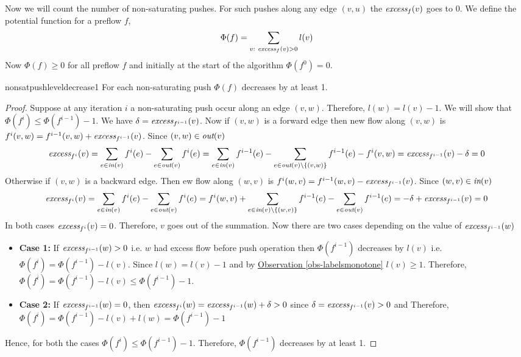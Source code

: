 Now we will count the number of non-saturating pushes. For such pushes along any edge $(v,u)$ the $\emph{excess}_f(v)$ goes to $0$. We define the potential function for a preflow $f$, $$\Phi(f)=\sum_{v:\emph{ excess}_f(v)>0}l(v)$$Now $\Phi(f)\geq 0$ for all preflow $f$ and initially at the start of the algorithm $\Phi(f^0)=0$.

\begin{lemma}{}{nonsatpushleveldecrease1}
	For each non-saturating push  $\Phi(f)$ decreases by at least 1.
\end{lemma}
\begin{proof}
	Suppose 	at any iteration $i$  a non-saturating push occur along an edge $(v,w)$. Therefore, $l(w)=l(v)-1$. We will show that $\Phi(f^i)\leq \Phi(f^{i-1})-1$.		We have $\delta=\emph{excess}_{f^{i-1}}(v)$. Now if $(v,w)$ is a forward edge then new flow along $(v,w)$ is $f^i(v,w)=f^{i-1}(v,w)+\emph{excess}_{f^{i-1}}(v)$. Since $(v,w)\in \emph{out}(v)$
	$$\emph{excess}_{f^i}(v)=\sum_{e\in \emph{in}(v)}f^i(e)-\sum_{e\in \emph{out}(v)}f^i(e)=          \sum_{e\in \emph{in}(v)}f^{i-1}(e)-\sum_{e\in \emph{out}(v)\setminus\{(v,w)\}}f^{i-1}(e)-f^i(v,w)  =   \emph{excess}_{f^{i-1}}(v)-\delta=0$$ Otherwise if $(v,w)$ is a backward edge. Then  ew flow along $(w,v)$ is  $f^i(w,v)=f^{i-1}(w,v)-\emph{excess}_{f^{i-1}}(v)$. Since $(w,v)\in \emph{in}(v)$ $$\emph{excess}_{f^i}(v)=\sum_{e\in \emph{in}(v)}f^i(e)-\sum_{e\in \emph{out}(v)}f^i(e)=    f^{i}(w,v) +     \sum_{e\in \emph{in}(v)\setminus\{(w,v)\}}f^{i-1}(e)-\sum_{e\in \emph{out}(v)}f^{i-1}(e)  =  -\delta+ \emph{excess}_{f^{i-1}}(v)=0$$In both cases $\emph{excess}_{f^i}(v)=0$. Therefore, 	 $v$ goes out of the summation. 		Now there are two cases depending on the value of $\emph{excess}_{f^{i-1}}(w)$\begin{itemize}[label=$\bullet$]
		\item \textbf{Case 1:}
		      If $\emph{excess}_{f^{i-1}}(w)>0$ i.e. $w$ had excess flow before push operation then $\Phi(f^{i-1})$ decreases by $l(v)$ i.e. $\Phi(f^i)=\Phi(f^{i-1})-l(v)$. Since $l(w)=l(v)-1$ and by  \hyperref[obs-labelsmonotone]{Observation \ref{obs-labelsmonotone}} $l(v)\geq 1$. Therefore, $\Phi(f^i)=\Phi(f^{i-1})-l(v)\leq \Phi(f^{i-1})-1$.
		\item \textbf{Case 2:}	If $\emph{excess}_{f^{i-1}}(w)=0$, then $\emph{excess}_{f^i}(w)=\emph{excess}_{f^{i-1}}(w)+\delta>0$ since $\delta=\emph{excess}_{f^{i-1}}(v)>0$ and Therefore, $\Phi(f^i)=\Phi(f^{i-1})-l(v)+l(w)=\Phi(f^{i-1})-1$
	\end{itemize}
	Hence, for both the cases $\Phi(f^i)\leq \Phi(f^{i-1})-1$. Therefore, $\Phi(f^{i-1})$ decreases by at least 1.
\end{proof}


